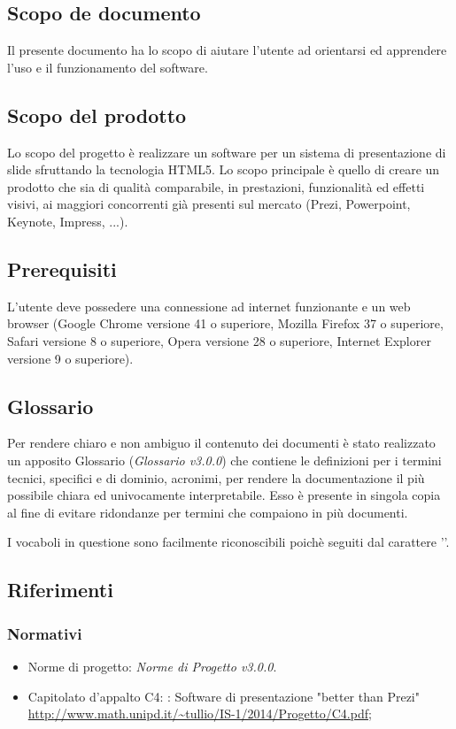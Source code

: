 \subsection{Scopo de documento}
Il presente documento ha lo scopo di aiutare l'utente ad orientarsi ed apprendere l'uso e il funzionamento del software.

\subsection{Scopo del prodotto}
Lo scopo del progetto è realizzare un software per un sistema di presentazione di \gls{slide} sfruttando la tecnologia \gls{HTML5}. Lo scopo principale è quello di creare un prodotto che sia di qualità comparabile, in prestazioni, funzionalità ed effetti visivi, ai maggiori concorrenti già presenti sul mercato (Prezi, Powerpoint, Keynote, Impress, ...).

\subsection{Prerequisiti}
L'utente deve possedere una connessione ad internet funzionante e un web browser (Google Chrome versione 41 o superiore, Mozilla Firefox 37 o superiore, Safari versione 8 o superiore, Opera versione 28 o superiore, Internet Explorer versione 9 o superiore).

\subsection{Glossario}
Per rendere chiaro e non ambiguo il contenuto dei documenti è stato realizzato un apposito Glossario (\textit{Glossario v3.0.0}) che contiene le definizioni per i termini tecnici, specifici e di dominio, acronimi, per rendere la documentazione il più possibile chiara ed univocamente interpretabile. Esso è presente in singola copia al fine di evitare ridondanze per termini che compaiono in più documenti.

I vocaboli in questione sono facilmente riconoscibili poichè seguiti dal carattere ''.

\subsection{Riferimenti}
\subsubsection{Normativi}

\begin{itemize}
	\item Norme di progetto: \textit{Norme di Progetto v3.0.0}.
	\item Capitolato d'appalto C4: \PROGETTO: Software di presentazione "better than Prezi" \\ \url{http://www.math.unipd.it/~tullio/IS-1/2014/Progetto/C4.pdf};
\end{itemize}
